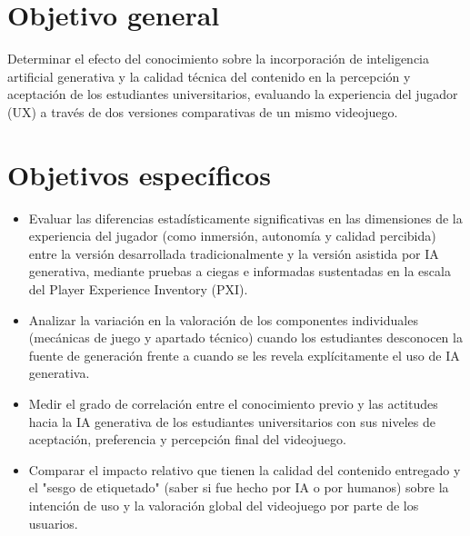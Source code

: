 \section{Objetivo general}
Determinar el efecto del conocimiento sobre la incorporación de inteligencia artificial generativa y la calidad técnica del contenido en la percepción y aceptación de los estudiantes universitarios, evaluando la experiencia del jugador (UX) a través de dos versiones comparativas de un mismo videojuego.

\section{Objetivos específicos}
\begin{itemize}
\item Evaluar las diferencias estadísticamente significativas en las dimensiones de la experiencia del jugador (como inmersión, autonomía y calidad percibida) entre la versión desarrollada tradicionalmente y la versión asistida por IA generativa, mediante pruebas a ciegas e informadas sustentadas en la escala del Player Experience Inventory (PXI).
\item Analizar la variación en la valoración de los componentes individuales (mecánicas de juego y apartado técnico) cuando los estudiantes desconocen la fuente de generación frente a cuando se les revela explícitamente el uso de IA generativa.
\item Medir el grado de correlación entre el conocimiento previo y las actitudes hacia la IA generativa de los estudiantes universitarios con sus niveles de aceptación, preferencia y percepción final del videojuego.
\item Comparar el impacto relativo que tienen la calidad del contenido entregado y el "sesgo de etiquetado" (saber si fue hecho por IA o por humanos) sobre la intención de uso y la valoración global del videojuego por parte de los usuarios.
\end{itemize}
